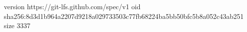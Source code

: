 version https://git-lfs.github.com/spec/v1
oid sha256:8d3d1b964a2207d9218a029733503c77fb68224ba5bb50bfc5b8a052c43ab251
size 3337
